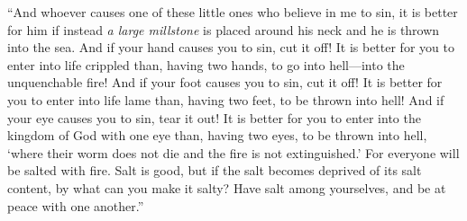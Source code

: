 \begin{biblechapter}
 “And whoever causes one of these little ones who believe in me to sin, it is better for him if instead \textit{a large millstone} is placed around his neck and he is thrown into the sea.
\verse And if your hand causes you to sin, cut it off! It is better for you to enter into life crippled than, having two hands, to go into hell—into the unquenchable fire!
\verse And if your foot causes you to sin, cut it off! It is better for you to enter into life lame than, having two feet, to be thrown into hell!
\verse And if your eye causes you to sin, tear it out! It is better for you to enter into the kingdom of God with one eye than, having two eyes, to be thrown into hell,
\verse ‘where their worm does not die and the fire is not extinguished.’
\verse For everyone will be salted with fire.
\verse Salt is good, but if the salt becomes deprived of its salt content, by what can you make it salty? Have salt among yourselves, and be at peace with one another.”
\end{biblechapter}

